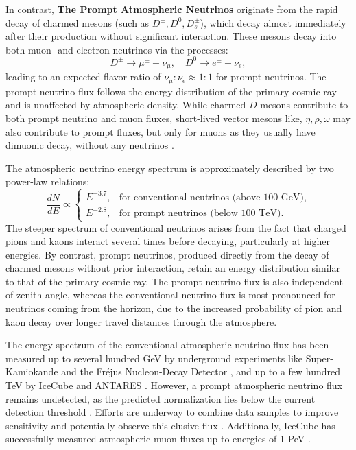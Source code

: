 In contrast, \textbf{The Prompt Atmospheric Neutrinos} originate from the rapid decay of charmed mesons (such as \(D^\pm, D^0, D_s^\pm\)), which decay almost immediately after their production without significant interaction. These mesons decay into both muon- and electron-neutrinos via the processes: 
\begin{equation}
    D^\pm \rightarrow \mu^\pm + \nu_\mu , \quad D^0 \rightarrow e^\pm + \nu_e ,
\end{equation}
leading to an expected flavor ratio of \(\nu_\mu : \nu_e \approx 1:1\) for prompt neutrinos. The prompt neutrino flux follows the energy distribution of the primary cosmic ray and is unaffected by atmospheric density. While charmed $D$ mesons contribute to both prompt neutrino and muon fluxes, short-lived vector mesons like, $\eta,\rho,\omega$ may also contribute to prompt fluxes, but only for muons as they usually have dimuonic decay, without any neutrinos .

The atmospheric neutrino energy spectrum is approximately described by two power-law relations:
\[
\frac{dN}{dE} \propto 
\begin{cases}
    E^{-3.7}, & \text{for conventional neutrinos (above 100 GeV)}, \\
    E^{-2.8}, & \text{for prompt neutrinos (below 100 TeV)}.
\end{cases}
\]
The steeper spectrum of conventional neutrinos arises from the fact that charged pions and kaons interact several times before decaying, particularly at higher energies. By contrast, prompt neutrinos, produced directly from the decay of charmed mesons without prior interaction, retain an energy distribution similar to that of the primary cosmic ray. The prompt neutrino flux is also independent of zenith angle, whereas the conventional neutrino flux is most pronounced for neutrinos coming from the horizon, due to the increased probability of pion and kaon decay over longer travel distances through the atmosphere.


The energy spectrum of the conventional atmospheric neutrino flux has been measured up to several hundred GeV by underground experiments like Super-Kamiokande  and the Fréjus Nucleon-Decay Detector , and up to a few hundred TeV by IceCube  and ANTARES . However, a prompt atmospheric neutrino flux remains undetected, as the predicted normalization lies below the current detection threshold . Efforts are underway to combine data samples to improve sensitivity and potentially observe this elusive flux . Additionally, IceCube has successfully measured atmospheric muon fluxes up to energies of 1 PeV .


